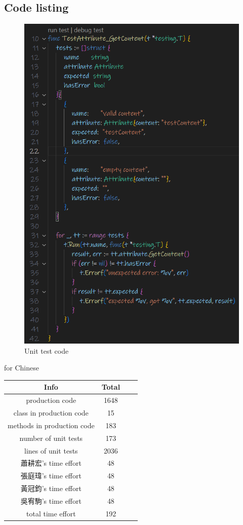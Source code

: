\documentclass[12pt]{article}
\begin{document}
    \subsection{Code listing}

    \begin{figure}[H]
        \begin{center}
            \includegraphics[width=0.4\linewidth]
            {assets/hw5/unit_test_code.png}
            \caption{Unit test code}
        \end{center}
    \end{figure}


    \begin{CJK*}{UTF8}{bsmi}
        for Chinese
        \begin{longtable}{|c|c|c|c|}
            \hline
            Info                       & Total \\
            \hline
            \endfirsthead
            \endhead
            \hline
            production code            & 1648  \\
            class in production code   & 15    \\
            methods in production code & 183   \\
            number of unit tests       & 173   \\
            lines of unit tests        & 2036  \\
            蕭耕宏's time effort          & 48    \\
            張庭瑋's time effort          & 48    \\
            黃冠鈞's time effort          & 48    \\
            吳宥駒's time effort          & 48    \\
            total time effort          & 192   \\
            \hline
        \end{longtable}
    \end{CJK*}
\end{document}
